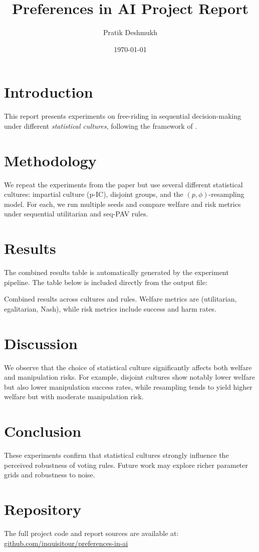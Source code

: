\documentclass[11pt]{article}
\title{Preferences in AI Project Report}
\author{Pratik Deshmukh}
\date{\today}
\begin{document}
\maketitle

\section{Introduction}
This report presents experiments on free-riding in sequential decision-making
under different \emph{statistical cultures}, following the framework of
\cite{nardi2022}.

\section{Methodology}
We repeat the experiments from the paper but use several different statistical
cultures: impartial culture (p-IC), disjoint groups, and the $(p, \phi)$-resampling
model. For each, we run multiple seeds and compare welfare and risk metrics under
sequential utilitarian and seq-PAV rules.

\section{Results}
The combined results table is automatically generated by the experiment
pipeline. The table below is included directly from the output file:

\begin{table}[h!]
\centering
\resizebox{\textwidth}{!}{%

}
\caption{Combined results across cultures and rules. Welfare metrics are
(utilitarian, egalitarian, Nash), while risk metrics include success and harm
rates.}
\label{tab:combined}
\end{table}

\section{Discussion}
We observe that the choice of statistical culture significantly affects both
welfare and manipulation risks. For example, disjoint cultures show notably
lower welfare but also lower manipulation success rates, while resampling tends
to yield higher welfare but with moderate manipulation risk.

\section{Conclusion}
These experiments confirm that statistical cultures strongly influence the
perceived robustness of voting rules. Future work may explore richer parameter
grids and robustness to noise.




\section*{Repository}
The full project code and report sources are available at: \\
\href{https://github.com/inquisitour/preferences-in-ai}{github.com/inquisitour/preferences-in-ai}
\end{document}
